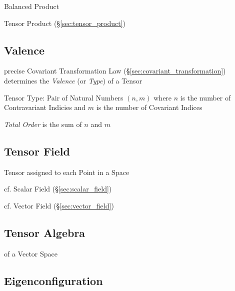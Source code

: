 {Balanced Product

\fist Tensor Product (\S\ref{sec:tensor_product})



\subsection{Valence}\label{sec:valence}

precise Covariant Transformation Law
(\S\ref{sec:covariant_transformation}) determines the \emph{Valence}
(or \emph{Type}) of a Tensor

Tensor Type: Pair of Natural Numbers $(n,m)$ where $n$ is the number
of Contravariant Indicies and $m$ is the number of Covariant Indices

\emph{Total Order} is the sum of $n$ and $m$



\subsection{Tensor Field}\label{sec:tensor_field}

Tensor assigned to each Point in a Space

cf. Scalar Field (\S\ref{sec:scalar_field})

cf. Vector Field (\S\ref{sec:vector_field})



\subsection{Tensor Algebra}\label{sec:tensor_algebra}

of a Vector Space



\subsection{Eigenconfiguration}\label{sec:eigenconfiguration}

}
